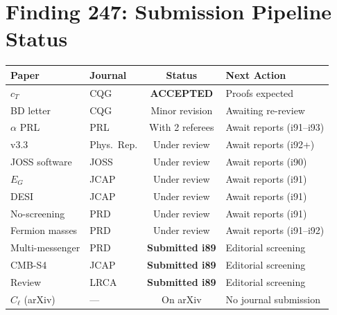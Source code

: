 \documentclass[11pt,a4paper]{article}
\begin{document}
\section{Finding 247: Submission Pipeline Status}

\begin{center}
\begin{tabular}{llcl}
\toprule
\textbf{Paper} & \textbf{Journal} & \textbf{Status} & \textbf{Next Action} \\
\midrule
$c_T$ & CQG & \textbf{ACCEPTED} & Proofs expected \\
BD letter & CQG & Minor revision & Awaiting re-review \\
$\alpha$ PRL & PRL & With 2 referees & Await reports (i91--i93) \\
v3.3 & Phys.\ Rep. & Under review & Await reports (i92+) \\
JOSS software & JOSS & Under review & Await reports (i90) \\
$E_G$ & JCAP & Under review & Await reports (i91) \\
DESI & JCAP & Under review & Await reports (i91) \\
No-screening & PRD & Under review & Await reports (i91) \\
Fermion masses & PRD & Under review & Await reports (i91--i92) \\
Multi-messenger & PRD & \textbf{Submitted i89} & Editorial screening \\
CMB-S4 & JCAP & \textbf{Submitted i89} & Editorial screening \\
Review & LRCA & \textbf{Submitted i89} & Editorial screening \\
$C_\ell$ (arXiv) & --- & On arXiv & No journal submission \\
\bottomrule
\end{tabular}
\end{center}
\end{document}
